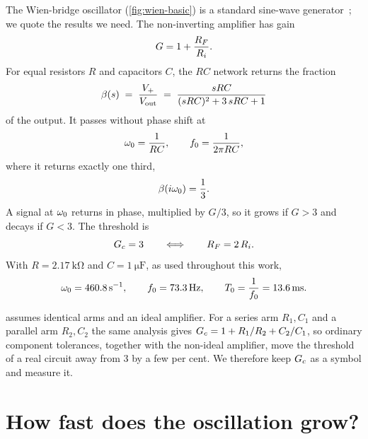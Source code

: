 The Wien-bridge oscillator (\cref{fig:wien-basic}) is a standard sine-wave
generator~\cite{HorowitzHill2015,SedraSmith2015,Mancini2001}; we quote the results we need. The
non-inverting amplifier has gain
\begin{equation}
  G = 1 + \frac{R_{F}}{R_{i}} .
  \label{eq:gain}
\end{equation}
For equal resistors $R$ and capacitors $C$, the $RC$ network returns the fraction
\begin{equation}
  \beta(s) \;=\; \frac{V_{+}}{V_{\mathrm{out}}} \;=\; \frac{sRC}{(sRC)^{2} + 3\,sRC + 1}
  \label{eq:beta}
\end{equation}
of the output. It passes without phase shift at
\begin{equation}
  \omega_{0} = \frac{1}{RC}, \qquad f_{0} = \frac{1}{2\pi RC},
  \label{eq:omega0}
\end{equation}
where it returns exactly one third,
\begin{equation}
  \beta(i\omega_{0}) = \frac{1}{3} .
  \label{eq:beta-third}
\end{equation}
A signal at $\omega_{0}$ returns in phase, multiplied by $G/3$, so it grows if $G>3$ and decays if $G<3$. The
threshold is
\begin{equation}
  G_{c} = 3 \qquad\Longleftrightarrow\qquad R_{F} = 2\,R_{i} .
  \label{eq:Gc}
\end{equation}
With $R=\SI{2.17}{\kilo\ohm}$ and $C=\SI{1}{\micro\farad}$, as used throughout this work,
\begin{equation}
  \omega_{0} = \SI{460.8}{\per\second}, \qquad f_{0} = \SI{73.3}{\hertz}, \qquad
  T_{0} = \frac{1}{f_{0}} = \SI{13.6}{\milli\second} .
  \label{eq:omega0-value}
\end{equation}

\begin{whybox}
 assumes identical arms and an ideal amplifier. For a series arm $R_{1},C_{1}$ and a
parallel arm $R_{2},C_{2}$ the same analysis gives $G_{c} = 1 + R_{1}/R_{2} + C_{2}/C_{1}$, so ordinary
component tolerances, together with the non-ideal amplifier, move the threshold of a real circuit away
from 3 by a few per cent. We therefore keep $G_{c}$ as a symbol and measure it.
\end{whybox}

\section{How fast does the oscillation grow?}\label{sec:growth}

